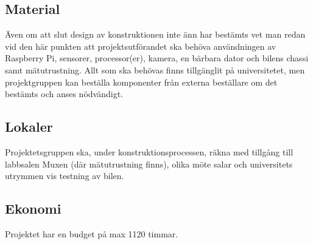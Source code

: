 \documentclass[projektplan/plan.tex]{subfiles}
\begin{document}
\subsection{Material}
Även om att slut design av konstruktionen inte änn har bestämts vet man redan vid den här punkten att projektsutförandet ska behöva användningen av Raspberry Pi, sensorer, processor(er), kamera, en bärbara dator och bilens chassi samt mätutrustning. Allt som ska behövas finns tillgänglit på universitetet, men projektgruppen kan beställa komponenter från externa beställare om det bestämts och anses nödvändigt.

\subsection{Lokaler}
Projektetsgruppen ska, under konstruktionsprocessen, räkna med tillgång till labbsalen Muxen (där mätutrustning finns), olika möte salar och universitets utrymmen vis testning av bilen.

\subsection{Ekonomi}
Projektet har en budget på max 1120 timmar.
\end{document}
